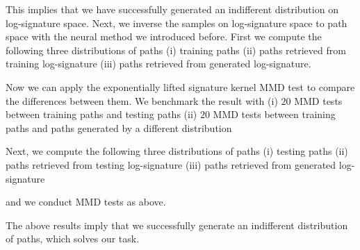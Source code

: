 \documentclass[12pt]{report}
\theoremstyle{definition}
\theoremstyle{remark}
\begin{document}
This implies that we have successfully generated an indifferent distribution on log-signature space. Next, we inverse the samples on log-signature space to path space with the neural method we introduced before. First we compute the following three distributions of paths (i) training paths (ii) paths retrieved from training log-signature (iii) paths retrieved from generated log-signature.

Now we can apply the exponentially lifted signature kernel MMD test to compare the differences between them. We benchmark the result with (i) $20$ MMD tests between training paths and testing paths (ii) $20$ MMD tests between training paths and paths generated by a different distribution

Next, we compute the following three distributions of paths (i) testing paths (ii) paths retrieved from testing log-signature (iii) paths retrieved from generated log-signature

and we conduct MMD tests as above. 

The above results imply that we successfully generate an indifferent distribution of paths, which solves our task. 
\end{document}
